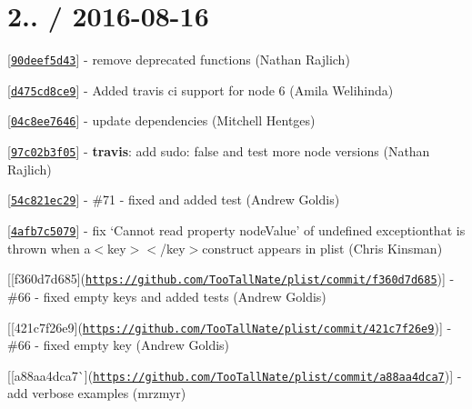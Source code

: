\section*{2.. / 2016-\/08-\/16 }


\begin{DoxyItemize}
\item \mbox{[}\href{https://github.com/TooTallNate/plist/commit/90deef5d43}{\tt {\ttfamily 90deef5d43}}\mbox{]} -\/ remove deprecated functions (Nathan Rajlich)
\item \mbox{[}\href{https://github.com/TooTallNate/plist/commit/d475cd8ce9}{\tt {\ttfamily d475cd8ce9}}\mbox{]} -\/ Added travis ci support for node 6 (Amila Welihinda)
\item \mbox{[}\href{https://github.com/TooTallNate/plist/commit/04c8ee7646}{\tt {\ttfamily 04c8ee7646}}\mbox{]} -\/ update dependencies (Mitchell Hentges)
\item \mbox{[}\href{https://github.com/TooTallNate/plist/commit/97c02b3f05}{\tt {\ttfamily 97c02b3f05}}\mbox{]} -\/ {\bfseries travis}\+: add {\ttfamily sudo\+: false} and test more node versions (Nathan Rajlich)
\item \mbox{[}\href{https://github.com/TooTallNate/plist/commit/54c821ec29}{\tt {\ttfamily 54c821ec29}}\mbox{]} -\/ \#71 -\/ fixed and added test (Andrew Goldis)
\item \mbox{[}\href{https://github.com/TooTallNate/plist/commit/4afb7c5079}{\tt {\ttfamily 4afb7c5079}}\mbox{]} -\/ fix `Cannot read property \textquotesingle{}node\+Value' of undefined exception{\ttfamily that is thrown when a}$<$key$>$$<$/key$>${\ttfamily construct appears in plist (Chris Kinsman)}
\item {\ttfamily \mbox{[}\mbox{[}}f360d7d685{\ttfamily \mbox{]}(\href{https://github.com/TooTallNate/plist/commit/f360d7d685}{\tt https\+://github.\+com/\+Too\+Tall\+Nate/plist/commit/f360d7d685})\mbox{]} -\/ \#66 -\/ fixed empty keys and added tests (Andrew Goldis)}
\item {\ttfamily \mbox{[}\mbox{[}}421c7f26e9{\ttfamily \mbox{]}(\href{https://github.com/TooTallNate/plist/commit/421c7f26e9}{\tt https\+://github.\+com/\+Too\+Tall\+Nate/plist/commit/421c7f26e9})\mbox{]} -\/ \#66 -\/ fixed empty key (Andrew Goldis)}
\item {\ttfamily \mbox{[}\mbox{[}}a88aa4dca7\`{}\mbox{]}(\href{https://github.com/TooTallNate/plist/commit/a88aa4dca7}{\tt https\+://github.\+com/\+Too\+Tall\+Nate/plist/commit/a88aa4dca7})\mbox{]} -\/ add verbose examples (mrzmyr)
\end{DoxyItemize}

